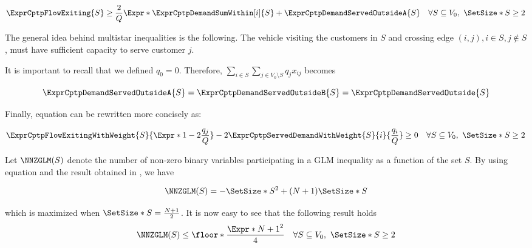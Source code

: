 \begin{equation}
	\label{eq:glm-inequality-v1}
	\begin{split}
		\ExprCptpFlowExiting{S} \ge \frac{2}{Q} \Expr*{  \ExprCptpDemandSumWithin[i]{S} + \ExprCptpDemandServedOutsideA{S} } \quad \forall S \subseteq V_0,\ \SetSize*{S} \ge 2
	\end{split}
\end{equation}

The general idea behind multistar inequalities is the following.
The vehicle visiting the customers in $S$ and crossing edge $(i, j), i \in S, j \notin S$,
must have sufficient capacity to serve customer $j$.

It is important to recall that we defined $q_0 = 0$.
Therefore, $\sum_{i \in S} \sum_{j \in V_0 \setminus S} q_j  x_{ij}$ becomes

\begin{equation}
	\ExprCptpDemandServedOutsideA{S} = \ExprCptpDemandServedOutsideB{S} =\ExprCptpDemandServedOutside{S}
\end{equation}

Finally, equation  can be rewritten more concisely as:

\begin{equation}
	\label{eq:glm-inequality}
	\begin{split}
		\ExprCptpFlowExitingWithWeight{S}{\Expr*{1 - 2 \frac{q_j}{Q}}} - 2 	\ExprCptpServedDemandWithWeight{S}{i}{\frac{q_i}{Q}}  \ge  0   \quad \forall S \subseteq V_0,\ \SetSize*{S} \ge 2
	\end{split}
\end{equation}

Let $\NNZGLM(S)$ denote the number of non-zero binary variables participating in a GLM inequality as a function of the set $S$.
By using equation  and the result obtained in , we have

\begin{equation}
	\NNZGLM(S) = -\SetSize*{S}^2 + (N + 1)\SetSize*{S}
\end{equation}

which is maximized when $\SetSize*{S} = \frac{N+1}{2}$.
It is now easy to see that the following result holds
\begin{equation}
	\label{eq:glm-nnz-ub}
	\NNZGLM(S) \le \floor*{ \frac{\Expr*{N + 1}^2}{4}} \quad \forall S \subseteq V_0,\ \SetSize*{S} \ge 2
\end{equation}
